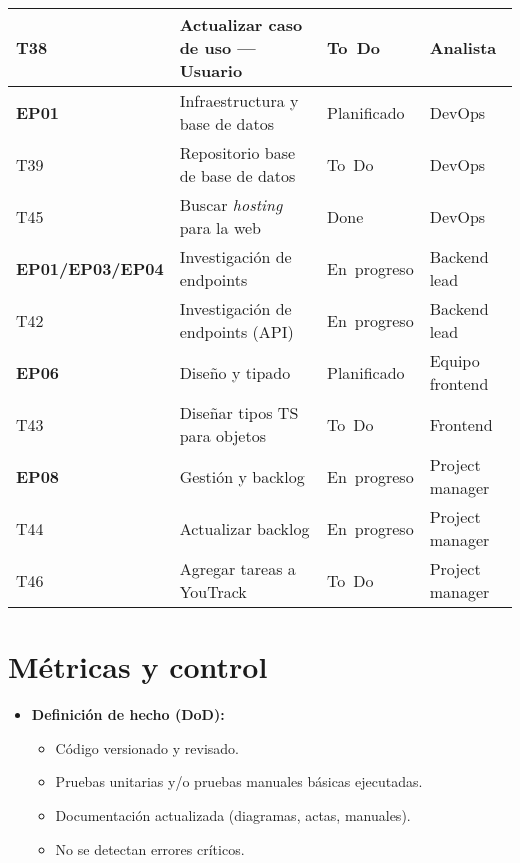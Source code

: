 \documentclass{article}
\begin{document}
\begin{longtable}{|l|p{8cm}|p{3cm}|p{4cm}|}
\hline
T38 & Actualizar caso de uso --- Usuario & To Do & Analista \\
\hline
\textbf{EP01} & Infraestructura y base de datos & Planificado & DevOps \\
\hline
T39 & Repositorio base de base de datos & To Do & DevOps \\
\hline
T45 & Buscar \emph{hosting} para la web & Done & DevOps \\
\hline
\textbf{EP01/EP03/EP04} & Investigación de endpoints & En progreso & Backend lead \\
\hline
T42 & Investigación de endpoints (API) & En progreso & Backend lead \\
\hline
\textbf{EP06} & Diseño y tipado & Planificado & Equipo frontend \\
\hline
T43 & Diseñar tipos TS para objetos & To Do & Frontend \\
\hline
\textbf{EP08} & Gestión y backlog & En progreso & Project manager \\
\hline
T44 & Actualizar backlog & En progreso & Project manager \\
\hline
T46 & Agregar tareas a YouTrack & To Do & Project manager \\
\hline
\end{longtable}

\section*{M\'etricas y control}
\begin{itemize}

    \item \textbf{Definici\'on de hecho (DoD):}
    \begin{itemize}
        \item C\'odigo versionado y revisado.
        \item Pruebas unitarias y/o pruebas manuales b\'asicas ejecutadas.
        \item Documentaci\'on actualizada (diagramas, actas, manuales).
        \item No se detectan errores cr\'iticos.
    \end{itemize}
\end{itemize}
\end{document}
